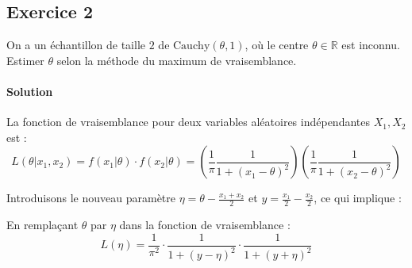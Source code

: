 \documentclass[../main.tex]{subfiles}
\begin{document}
\begin{CJK*}{UTF8}{gbsn}

\section*{Exercice 2}

On a un échantillon de taille $2$ de $\text{Cauchy}(\theta, 1)$, où le centre $\theta \in \mathbb{R}$ est inconnu.
Estimer $\theta$ selon la méthode du maximum de vraisemblance. 

\paragraph{Solution}
La fonction de vraisemblance pour deux variables aléatoires indépendantes $X_1, X_2$ est :
\begin{equation*}
L(\theta | x_1, x_2) = f(x_1 | \theta) \cdot f(x_2 | \theta) = \left( \frac{1}{\pi} \frac{1}{1 + (x_1 - \theta)^2} \right) \left( \frac{1}{\pi} \frac{1}{1 + (x_2 - \theta)^2} \right)
\end{equation*}

Introduisons le nouveau paramètre $\eta = \theta - \frac{x_1 + x_2}{2}$ et $y = \frac{x_1}{2} - \frac{x_2}{2} $, ce qui implique :

En remplaçant $\theta$ par $\eta$ dans la fonction de vraisemblance :
\begin{equation*}
L(\eta) =\frac{1}{\pi^2} \cdot \frac{1}{1 + (y - \eta)^2} \cdot \frac{1}{1 + (y + \eta)^2}
\end{equation*}
\end{CJK*}
\end{document}
